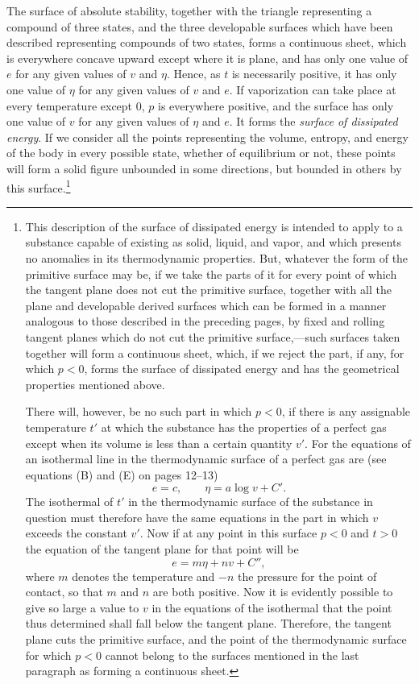 \documentclass[11pt]{article}
\begin{document}
The surface of absolute stability, together with the triangle representing a compound of three states, and the three developable surfaces which have been described representing compounds of two states, forms a continuous sheet, which is everywhere concave upward except where it is plane, and has only one value of $e$ for any given values of $v$ and $\eta$. Hence, as $t$ is necessarily positive, it has only one value of $\eta$ for any given values of $v$ and $e$. If vaporization can take place at every temperature except $0$, $p$ is everywhere positive, and the surface has only one value of $v$ for any given values of $\eta$ and $e$. It forms the \emph{surface of dissipated energy}. If we consider all the points representing the volume, entropy, and energy of the body in every possible state, whether of equilibrium or not, these points will form a solid figure unbounded in some directions, but bounded in others by this surface.\footnote{This description of the surface of dissipated energy is intended to apply to a substance capable of existing as solid, liquid, and vapor, and which presents no anomalies in its thermodynamic properties. But, whatever the form of the primitive surface may be, if we take the parts of it for every point of which the tangent plane does not cut the primitive surface, together with all the plane and developable derived surfaces which can be formed in a manner analogous to those described in the preceding pages, by fixed and rolling tangent planes which do not cut the primitive surface,---such surfaces taken together will form a continuous sheet, which, if we reject the part, if any, for which $p<0$, forms the surface of dissipated energy and has the geometrical properties mentioned above.

There will, however, be no such part in which $p<0$, if there is any assignable temperature $t'$ at which the substance has the properties of a perfect gas except when its volume is less than a certain quantity $v'$. For the equations of an isothermal line in the thermodynamic surface of a perfect gas are (see equations (B) and (E) on pages 12--13)
\[
e=c,
\qquad
\eta=a\log v+C'.
\]
The isothermal of $t'$ in the thermodynamic surface of the substance in question must therefore have the same equations in the part in which $v$ exceeds the constant $v'$. Now if at any point in this surface $p<0$ and $t>0$ the equation of the tangent plane for that point will be
\[
e=m\eta+nv+C'',
\]
where $m$ denotes the temperature and $-n$ the pressure for the point of contact, so that $m$ and $n$ are both positive. Now it is evidently possible to give so large a value to $v$ in the equations of the isothermal that the point thus determined shall fall below the tangent plane. Therefore, the tangent plane cuts the primitive surface, and the point of the thermodynamic surface for which $p<0$ cannot belong to the surfaces mentioned in the last paragraph as forming a continuous sheet.}
\end{document}
